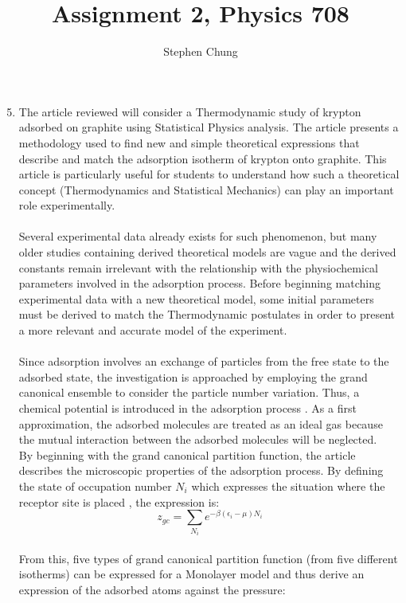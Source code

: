 \documentclass[12pt,a4paper]{article}
\begin{document}
	\title{Assignment 2, Physics 708}
	\author{Stephen Chung}
	\date{}
	\maketitle
		
\begin{enumerate}	
	\setcounter{enumi}{4}
    \item The article \cite{arti} reviewed will consider a Thermodynamic study of krypton adsorbed on graphite using Statistical Physics analysis. The article presents a methodology used to find new and simple theoretical expressions that describe and match the adsorption isotherm of krypton onto graphite. This article is particularly useful for students to understand how such a theoretical concept (Thermodynamics and Statistical Mechanics) can play an important role experimentally.\\
    \\
    Several experimental data already exists for such phenomenon, but many older studies \cite{pari} containing derived theoretical models are vague and the derived constants remain irrelevant with the relationship with the physiochemical parameters involved in the adsorption process. Before beginning matching experimental data with a new theoretical model, some initial parameters must be derived to match the Thermodynamic postulates in order to present a more relevant and accurate model of the experiment.\\
    \\
    Since adsorption involves an exchange of particles from the free state to the adsorbed state, the investigation is approached by employing the grand canonical ensemble to consider the particle number variation. Thus, a chemical potential is introduced in the adsorption process \cite{chem}. As a first approximation, the adsorbed molecules are treated as an ideal gas \cite{chem} because the mutual interaction between the adsorbed molecules will be neglected.\\
    By beginning with the grand canonical partition function, the article describes the microscopic properties of the adsorption process. By defining the state of occupation number $N_i$ which expresses the situation where the receptor site is placed \cite{theo,dye}, the expression is:
    \[z_{gc} = \sum\limits_{N_i}e^{-\beta(\epsilon_i-\mu)N_i}\]
    \\
    From this, five types of grand canonical partition function (from five different isotherms) can be expressed for a Monolayer model and thus derive an expression of the adsorbed atoms against the pressure:
    

\end{enumerate}
\end{document}

